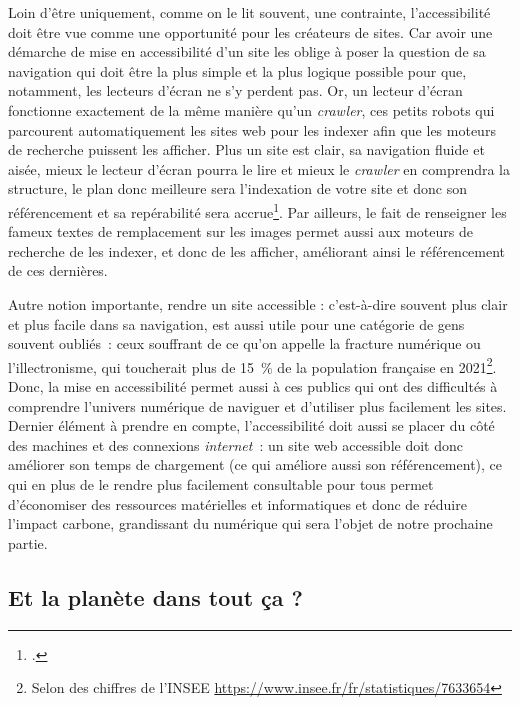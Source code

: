 Loin d’être uniquement, comme on le lit souvent, une contrainte, l’accessibilité doit être vue comme une opportunité pour les créateurs de sites. Car avoir une démarche de mise en accessibilité d’un site les oblige à poser la question de sa navigation qui doit être la plus simple et la plus logique possible pour que, notamment, les lecteurs d’écran ne s’y perdent pas. Or, un lecteur d’écran fonctionne exactement de la même manière qu’un \textit{crawler}, ces petits robots qui parcourent automatiquement les sites web pour les indexer afin que les moteurs de recherche puissent les afficher. Plus un site est clair, sa navigation fluide et aisée, mieux le lecteur d’écran pourra le lire et mieux le \textit{crawler} en comprendra la structure, le plan donc meilleure sera l’indexation de votre site et donc son référencement et sa repérabilité sera accrue\footcite{adminat_et_2023}. Par ailleurs, le fait de renseigner les fameux textes de remplacement sur les images permet aussi aux moteurs de recherche de les indexer, et donc de les afficher, améliorant ainsi le référencement de ces dernières.

Autre notion importante, rendre un site accessible : c’est-à-dire souvent plus clair et plus facile dans sa navigation, est aussi utile pour une catégorie de gens souvent oubliés : ceux souffrant de ce qu’on appelle la fracture numérique ou l’illectronisme, qui toucherait plus de 15 \% de la population française en 2021\footnote{Selon des chiffres de l'INSEE \url{https://www.insee.fr/fr/statistiques/7633654}}. Donc, la mise en accessibilité permet aussi à ces publics qui ont des difficultés à comprendre l’univers numérique de naviguer et d’utiliser plus facilement les sites. Dernier élément à prendre en compte, l’accessibilité doit aussi se placer du côté des machines et des connexions \textit{internet} : un site web accessible doit donc améliorer son temps de chargement (ce qui améliore aussi son référencement), ce qui en plus de le rendre plus facilement consultable pour tous permet d’économiser des ressources matérielles et informatiques et donc de réduire l’impact carbone, grandissant du numérique qui sera l’objet de notre prochaine partie.

\subsection{Et la planète dans tout ça ?}

